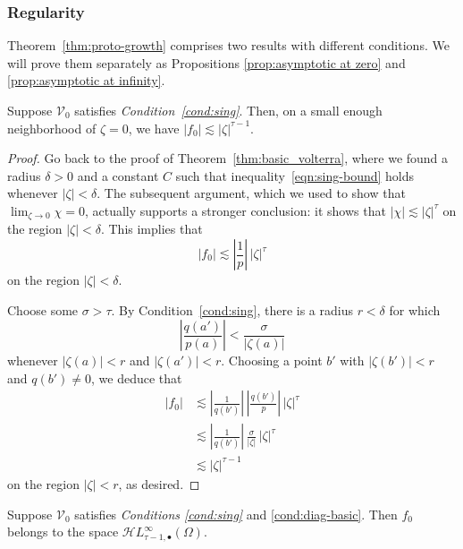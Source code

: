 \documentclass[final]{siamart220329}
\newcommand{\singexp}[2]{\mathcal{H}L^\infty_{#1, #2}}
\newcommand{\singexpalg}[1]{\singexp{#1}{\bullet}}
\newcommand{\hardpart}{\mathcal{V}_0}
\newcommand{\solproto}{f_0}
\newcommand{\domain}{\Omega}
\begin{document}
\subsubsection{Regularity}\label{sec:asymptotics}
Theorem~\ref{thm:proto-growth} comprises two results with different conditions. We will prove them separately as Propositions \ref{prop:asymptotic at zero} and \ref{prop:asymptotic at infinity}.
\begin{proposition}\label{prop:asymptotic at zero}
Suppose $\hardpart$ satisfies {\em Condition~\eqref{cond:sing}}. Then, on a small enough neighborhood of $\zeta = 0$, we have $|\solproto| \lesssim |\zeta|^{\tau-1}$.
\end{proposition}

\begin{proof}
Go back to the proof of Theorem~\ref{thm:basic_volterra}, where we found a radius $\delta > 0$ and a constant $C$ such that inequality~\eqref{eqn:sing-bound} holds whenever $|\zeta| < \delta$. The subsequent argument, which we used to show that $\lim_{\zeta \to 0} \chi = 0$, actually supports a stronger conclusion: it shows that $|\chi| \lesssim |\zeta|^\tau$ on the region $|\zeta| < \delta$. This implies that
\[ |\solproto| \lesssim \left|\frac{1}{p}\right|\,|\zeta|^\tau \]
on the region $|\zeta| < \delta$.

Choose some $\sigma > \tau$. By Condition~\eqref{cond:sing}, there is a radius $r < \delta$ for which
\[ \left|\frac{q(a')}{p(a)}\right| < \frac{\sigma}{|\zeta(a)|} \]
whenever $|\zeta(a)| < r$ and $|\zeta(a')| < r$. Choosing a point $b'$ with $|\zeta(b')| < r$ and $q(b') \neq 0$, we deduce that
\begin{align*}
|\solproto| & \lesssim \left|\frac{1}{q(b')}\right|\,\left|\frac{q(b')}{p}\right|\,|\zeta|^\tau \\
& \lesssim \left|\frac{1}{q(b')}\right|\,\frac{\sigma}{|\zeta|}\,|\zeta|^\tau \\
& \lesssim |\zeta|^{\tau-1}
\end{align*}
on the region $|\zeta| < r$, as desired.
\end{proof}
\begin{proposition}\label{prop:asymptotic at infinity}
Suppose $\hardpart$ satisfies {\em Conditions \eqref{cond:sing}} and \eqref{cond:diag-basic}. Then $\solproto$ belongs to the space $\singexpalg{\tau-1}(\domain)$.
\end{proposition}
\end{document}
